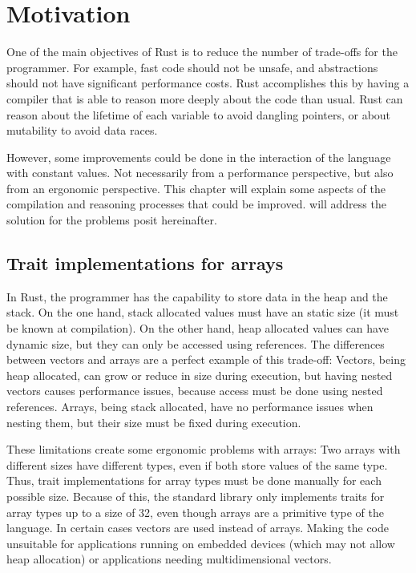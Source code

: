\chapter{Motivation}
One of the main objectives of Rust is to reduce the number of trade-offs for
the programmer. For example, fast code should not be unsafe, and abstractions
should not have significant performance costs. Rust accomplishes this by having
a compiler that is able to reason more deeply about the code than usual. Rust
can reason about the lifetime of each variable to avoid dangling pointers, or
about mutability to avoid data races. 

However, some improvements could be done in the interaction of the language
with constant values. Not necessarily from a performance perspective, but also
from an ergonomic perspective. This chapter will explain some aspects of the
compilation and reasoning processes that could be improved.
 will address the solution for the problems
posit hereinafter.

\label{chap:motivation}
\section{Trait implementations for arrays}
In Rust, the programmer has the capability to store data in the heap and the
stack. On the one hand, stack allocated values must have an static size (it
must be known at compilation). On the other hand, heap allocated values can
have dynamic size, but they can only be accessed using references. The
differences between vectors and arrays are a perfect example of this trade-off:
Vectors, being heap allocated, can grow or reduce in size during execution, but
having nested vectors causes performance issues, because access must be done
using nested references. Arrays, being stack allocated, have no performance
issues when nesting them, but their size must be fixed during execution.

These limitations create some ergonomic problems with arrays: Two arrays with
different sizes have different types, even if both store values of the same
type. Thus, trait implementations for array types must be done manually for
each possible size. Because of this, the standard library only implements
traits for array types up to a size of 32, even though arrays are a primitive
type of the language. In certain cases vectors are used instead of arrays.
Making the code unsuitable for applications running on embedded devices (which
may not allow heap allocation) or applications needing multidimensional
vectors.


